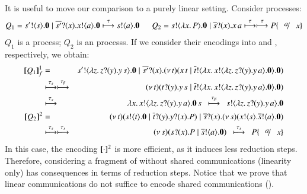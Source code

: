 \documentclass[runningheads]{llncs}
\begin{document}
{It is useful to move our comparison 
to a purely linear setting. %
Consider processes:
\begin{eqnarray*}
	Q_1  =  \bout{s'}{s} \inact \Par \binp{\dual{s'}}{x} \bout{x}{a} \inact
	\hby{\tau}
	\bout{s}{a} \inact \quad~~
	Q_2  =  \bout{s}{\abs{x}{P}} \inact \Par \binp{\dual{s}}{x} \appl{x}{a}
	\hby{\tau}
	\hby{\tau}
	P \subst{a}{x}
\end{eqnarray*}
$Q_1$ is a \sessp process; $Q_2$ is an \HO processs.
If we consider their encodings into \HO and \sessp, respectively,
we obtain:
\begin{eqnarray*}
	\map{Q_1}_f^{1} & = & \bout{s'}{\abs{z}{\binp{z}{y} \appl{y}{s}}} \inact \Par \binp{\dual{s'}}{x} \newsp{t}{\appl{x}{t} \Par \bout{\dual{t}}{\abs{x}{\bout{x}{\abs{z}{\binp{z}{y} \appl{y}{a}}} \inact}} \inact}\\
	& \hby{\stau} \hby{\btau}& 
	\newsp{t}{\binp{t}{y} \appl{y}{s} \Par \bout{\dual{t}}{\abs{x}{\bout{x}{\abs{z}{\binp{z}{y} \appl{y}{a}}} \inact}} \inact}\\
	& \hby{\stau} & 
	\appl{\abs{x}{\bout{x}{\abs{z}{\binp{z}{y} \appl{y}{a}}} \inact}}{s}
	~~\hby{\btau}~~
	\bout{s}{\abs{z}{\binp{z}{y} \appl{y}{a}}} \inact \\
	\pmap{Q_2}{2} & = & \newsp{t}{\bout{s}{t} \inact \Par \binp{\dual{t}}{y} \binp{y}{x} P} \Par \binp{\dual{s}}{x} \newsp{s}{\bout{x}{s} \bout{\dual{s}}{a} \inact}
	\\
	& \hby{\stau} \hby{\stau} & 
	\newsp{s}{\binp{s}{x} P \Par \bout{\dual{s}}{a} \inact}
	~~
	\hby{\stau} ~~
	P\subst{a}{x}
\end{eqnarray*}
In this case, the encoding $[\!\![\cdot]\!\!]^2$ is more efficient, as it induces less reduction steps.
Therefore, considering a fragment of \HOp without shared communications (linearity only)
has consequences in terms of reduction steps. Notice that we prove that linear communications do 
not suffice to encode shared communications ().

}
\end{document}
